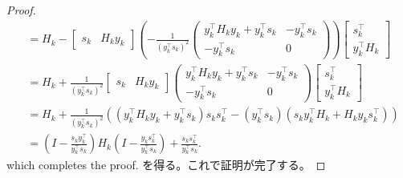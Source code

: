 \documentclass[0_main]{subfiles}
\begin{document}
\begin{proof}
\begin{align*}
                & = H_k- \begin{bmatrix}s_k                                                                                                                             & H_k y_k\end{bmatrix}\left(-\frac{1}{(y_k^\top s_k)^2}\begin{pmatrix}y_k^\top H_k y_k + y_k^\top s_k & -y_k^\top s_k                                                                                                                                                                                                                                         \\-y_k^\top s_k                 & 0    \end{pmatrix}\right) \begin{bmatrix} s_k^\top                                                      \\     y_k^\top H_k\end{bmatrix} \\
                & = H_k+\frac{1}{(y_k^\top s_k)^2}\begin{bmatrix}s_k                                                                                                    & H_k y_k\end{bmatrix} \begin{pmatrix}y_k^\top H_k y_k + y_k^\top s_k                                & -y_k^\top s_k                                                                                                                                                                                                                                         \\-y_k^\top s_k                 & 0\end{pmatrix} \begin{bmatrix}s_k^\top                                                             \\    y_k^\top H_k\end{bmatrix}        \\
                & = H_k+\frac{1}{(y_k^\top s_k)^2} \left((y_k^\top H_k y_k + y_k^\top s_k) s_k s_k^\top - (y_k^\top s_k)(s_k y_k^\top H_k + H_k y_k s_k^\top) \right)                                                                                                                                                                                                                                                                                                                                                                                                                                                                                                                                            \\
                & = \left(I - \frac{s_k y_k^\top}{y_k^\top s_k}\right) H_k \left(I - \frac{y_k s_k^\top}{y_k^\top s_k}\right) + \frac{s_k s_k^\top}{y_k^\top s_k}.
    \end{align*}
    \ifEn
        which completes the proof.
    \else
        を得る。これで証明が完了する。
    \fi
    \myQED
\end{proof}
\end{document}
